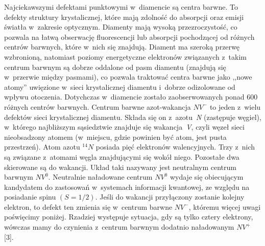 Najciekawszymi defektami punktowymi w~diamencie są centra barwne. To defekty struktury krystalicznej, które mają zdolność do absorpcji oraz emisji światła w~zakresie optycznym. Diamenty mają wysoką przezroczystość, co pozwala na łatwą obserwację fluorescencji lub absorpcji pochodzącej od różnych centrów barwnych, które w~nich się znajdują.
Diament ma szeroką przerwę wzbronioną, natomiast poziomy energetyczne elektronów związanych z~takim centrum barwnym są dobrze oddalone od pasm diamentu (znajdują się w~przerwie między pasmami), co pozwala traktować centra barwne jako ,,nowe atomy'' uwięzione w~sieci krystalicznej diamentu i~dobrze odizolowane od wpływu otoczenia. Dotychczas w~diamencie zostało zaobserwowanych ponad 600 różnych centrów barwnych.
Centrum barwne azot-wakancja $NV^{-}$ to jeden z~wielu defektów sieci krystalicznej diamentu. Składa się on z~azotu~\textit{N} (zastępuje węgiel), w~którego najbliższym sąsiedztwie znajduje się wakancja~\textit{V}, czyli węzeł sieci nieobsadzony atomem (w~miejscu, gdzie powinien być atom, jest pusta przestrzeń). Atom azotu $^{14}N$ posiada pięć elektronów walencyjnych. Trzy z~nich są związane z~atomami węgla znajdującymi się wokół niego. Pozostałe dwa skierowane są do wakancji. Układ taki nazywany jest neutralnym centrum barwnym $NV^0$. Neutralnie naładowane centrum $NV^0$ wydaje się obiecującym kandydatem do zastosowań w~systemach informacji kwantowej, ze względu na posiadanie spinu $(S = 1/2)$. Jeśli do wakancji przyłączony zostanie kolejny elektron, to defekt ten zmienia się w~centrum barwne $NV^{-}$, któremu więcej uwagi poświęcimy poniżej. Rzadziej występuje sytuacja, gdy są tylko cztery
elektrony, wówczas mamy do czynienia z~centrum barwnym dodatnio naładowanym $NV^+$ [3].

